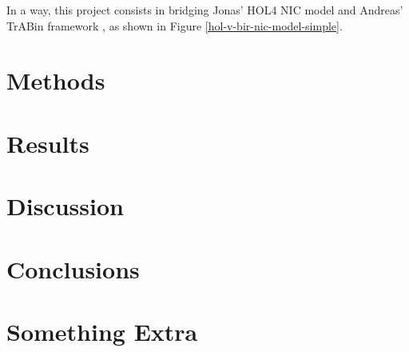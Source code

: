 \documentclass{kththesis}
\begin{document}
In a way, this project consists in bridging Jonas' HOL4 NIC model \cite{haglund_formal_2016} and Andreas' TrABin framework \cite{lindner_trabin:_2019}, as shown in Figure \ref{hol-v-bir-nic-model-simple}.

\chapter{Methods}

\chapter{Results}

\chapter{Discussion}

\chapter{Conclusions}

\printbibliography[heading=bibintoc]

\appendix

\chapter{Something Extra}

\tailmatter %
\end{document}

